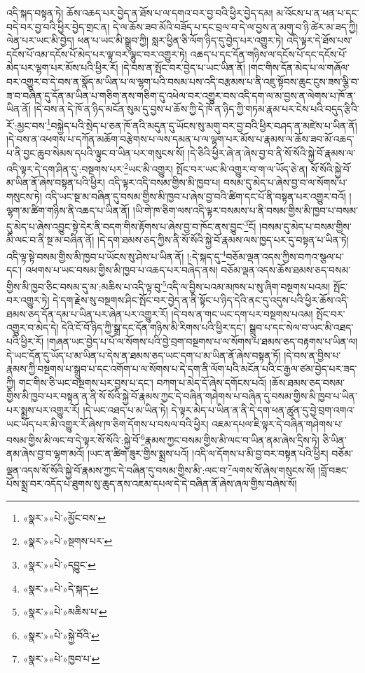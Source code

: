 འདི་སྐད་བསྟན་ཏེ། ཆོས་འཆད་པར་བྱེད་ན་ཐོས་པ་ལ་དགའ་བར་བྱ་བའི་ཕྱིར་བྱེད་དམ། མ་འོངས་པ་ན་ཕན་པ་དང་བདེ་བར་བྱ་བའི་ཕྱིར་བྱེད་གྲང་ན། དེ་ལ་ཆོས་ཟབ་མོའི་བཟོད་པ་དང་བྲལ་བ་དེ་ལ་བྱས་ན་མགུ་བ་ཉི་ཚེར་མ་ཟད་ཀྱི། ལེན་པར་ཡང་མི་བྱེད། ཕན་པ་ཡང་མི་སྒྲུབ་ཀྱི། སླར་ཕྱིན་ཅི་ལོག་ཉིད་དུ་བྱེད་པར་འགྱུར་ཏེ། འདི་ལྟར་དེ་ཐོས་པས་དངོས་པོ་འམ་དངོས་པོ་མེད་པར་ལྟ་བར་ལྷུང་བར་འགྱུར་ཏེ། འཆད་པ་དང་དོན་གཉིས་ལ་དངོས་པོ་དང་དངོས་པོ་མེད་པར་ལྷག་པར་མོས་པའི་ཕྱིར་རོ། །དེ་བས་ན་སྤོང་བར་བྱེད་པ་ཡང་ཡིན་ནོ། །གང་གིས་དོན་མེད་པ་ལ་གཞོལ་བར་འགྱུར་བ་དེ་བས་ན་སྣོད་མ་ཡིན་པ་ལ་ལྷག་པའི་བསམ་པས་འདི་བརྩམས་པ་ནི་འཇུ་སྟོབས་ཆུང་ངུས་ཟས་ལྕི་བ་ཟ་བ་བཞིན་དུ་དོན་མ་ཡིན་པ་གཅིག་ནས་གཅིག་དུ་འཕེལ་བར་འགྱུར་བས་འདི་དག་ལ་མ་བྱས་ན་ལེགས་པ་ཁོ་ན་ཡིན་ནོ། །དེ་བས་ན་དེ་ཁོ་ན་ཉིད་མངོན་སུམ་དུ་བྱས་པ་ཆོས་ཀྱི་དེ་ཁོ་ན་ཉིད་ཀྱི་གཏམ་རྣམ་པར་ངེས་པའི་བདུད་རྩིའི་རོ་:མྱང་བས་\footnote{«སྣར་»«པེ་»མྱོང་བས་}བསྐྱེད་པའི་སྲེད་པ་ཅན་ཁོ་ནའི་མདུན་དུ་ཡོངས་སུ་མགུ་བར་བྱ་བའི་ཕྱིར་བཤད་ན་མཛེས་པ་ཡིན་ནོ། །དེ་བས་ན་འཕགས་པ་དཀོན་མཆོག་བརྩེགས་པ་ལས་དམན་པ་ལ་ལྷག་པར་མོས་པ་རྣམས་ལ་ཆོས་ཟབ་མོ་འཆད་པ་ནི་བྱང་ཆུབ་སེམས་དཔའི་ལྟུང་བ་ཡིན་པར་གསུངས་སོ། །དེ་ཅིའི་ཕྱིར་ཞེ་ན་ཞེས་བྱ་བ་ནི་སོ་སོའི་སྐྱེ་བོ་རྣམས་ལ་འདི་ལྟར་དེ་དག་ཤིན་དུ་:བསྔགས་པར་\footnote{«སྣར་»«པེ་»སྔགས་པར་}ཡང་མི་འགྱུར། སྤོང་བར་ཡང་མི་འགྱུར་བ་ག་ལ་ཡོད་ཅེ་ན། སོ་སོའི་སྐྱེ་བོ་མ་ཡིན་ནོ་ཞེས་བསྟན་པའི་ཕྱིར། འདི་ལྟར་འདི་བསམ་གྱིས་མི་ཁྱབ་པ། བསམ་དུ་མེད་པ་ཞེས་བྱ་བ་ལ་སོགས་པ་གསུངས་ཏེ། འདི་ཡང་སྔ་མ་བཞིན་དུ་བསམ་གྱིས་མི་ཁྱབ་པ་ཞེས་བྱ་བའི་ཚིག་དང་པོ་ནི་བསྟན་པར་འགྱུར་བའོ། །ལྷག་མ་ཚིག་གཉིས་ནི་འཆད་པ་ཡིན་ནོ། །ཡི་གེ་ཁ་ཅིག་ལས་འདི་ལྟར་བསམས་པ་ནི་བསམ་གྱིས་མི་ཁྱབ་པ་བསམ་དུ་མེད་པ་ཞེས་འབྱུང་སྟེ་དེར་ནི་བདག་གིས་རྟོགས་པ་ཞེས་བྱ་བ་ཁོང་ནས་བྱུང་\footnote{«སྣར་»«པེ་»དབྱུང་}ངོ། །བསམ་དུ་མེད་པ་བསམ་གྱིས་མི་ལང་བ་ནི་སྔ་མ་བཞིན་ནོ། །དེ་དག་ཐམས་ཅད་ཀྱིས་ནི་སོ་སོའི་སྐྱེ་བོ་རྣམས་ལས་ཁྱད་པར་དུ་བསྟན་པ་ཡིན་ཏེ། འདི་ལྟ་སྟེ་བསམ་གྱིས་མི་ཁྱབ་པ་ཡོངས་སུ་ཤེས་པ་ཡིན་ནོ། །:དེ་སྐད་དུ་\footnote{«སྣར་»«པེ་»དེ་སྐད་}བཅོམ་ལྡན་འདས་ཀྱིས་བཀའ་སྩལ་པ་དང་། འཕགས་པ་ཡང་བསམ་གྱིས་མི་ཁྱབ་པ་འཆད་པར་བཞེད་ནས། བཅོམ་ལྡན་འདས་ཆོས་ཐམས་ཅད་བསམ་གྱིས་མི་ཁྱབ་ཅིང་བསམ་དུ་མ་:མཆིས་པ་འདི་ལྟ་བུ་\footnote{«སྣར་»«པེ་»མཆིས་པ་}འདི་ལ་བྱིས་པའམ་མཁས་པ་སུ་ཞིག་བསྔགས་པའམ། སྤོང་བར་འགྱུར་ཏེ། དེ་དག་རྗེས་སུ་བསྔགས་ཤིང་སྤོང་བར་བྱེད་ན་ནི་སྟོང་པ་ཉིད་དེའི་ནང་དུ་འདུས་པའི་ཕྱིར་ཆོས་འདི་ཐམས་ཅད་དོན་དམ་པ་ཡིན་པར་ཞེན་པར་འགྱུར་རོ། །དེ་བས་ན་གང་ཡང་དག་པར་བསྔགས་པའམ། སྤོང་བར་འགྱུར་བ་མེད་དེ། དེའི་ངོ་བོ་ཉིད་ཀྱི་སྒྲ་དང་དོན་གཉིས་མི་རིགས་པའི་ཕྱིར་དང་། སྒྲུབ་པ་དང་སེལ་བ་ཡང་མི་འཐད་པའི་ཕྱིར་རོ། །གཞན་ཡང་བྱེད་པ་པོ་ལ་སོགས་པའི་བྱེ་བྲག་བསྔགས་པ་ལ་སོགས་པ་ཐམས་ཅད་བརྟགས་པ་ཡིན་ལ། དེ་ཡང་དོན་དུ་ཡོད་པ་མ་ཡིན་པ་དེས་ན་ཐམས་ཅད་ཡང་དག་པ་མ་ཡིན་ནོ་ཞེས་བསྟན་ཏོ། །དེ་བས་ན་བྱིས་པ་རྣམས་ཀྱི་བསྔགས་པ་སྒྲུབ་པ་དང་འགོག་པ་ལ་སོགས་པ་དེ་དག་ནི་ལོག་པའི་མངོན་པའི་ང་རྒྱལ་ཙམ་བྱེད་པར་ཟད་ཀྱི། གང་གིས་ཅི་ཡང་བསྔགས་པར་བྱས་པ་དང་། བཀག་པ་མེད་དོ་ཞེས་དགོངས་པའོ། །ཆོས་ཐམས་ཅད་བསམ་གྱིས་མི་ཁྱབ་པར་བསྟན་ན་ནི་སོ་སོའི་སྐྱེ་བོ་རྣམས་ཀྱང་དེ་བཞིན་གཤེགས་པ་བཞིན་དུ་བསམ་གྱིས་མི་ཁྱབ་པ་ཡིན་པར་སྨྲས་པར་འགྱུར་རོ། །དེ་ཡང་འཐད་པ་མ་ཡིན་ཏེ། དེ་ལྟར་མེད་པ་ཡིན་ན་ནི་དེ་དག་ཕན་ཚུན་དུ་བྱེ་བྲག་འགའ་ཡང་ཡོད་པར་མི་འགྱུར་རོ་ཞེས་ཁ་ཅིག་དོགས་པ་བསལ་བའི་ཕྱིར། འཇམ་དཔལ་ཇི་ལྟར་དེ་བཞིན་གཤེགས་པ་བསམ་གྱིས་མི་ལང་བ་དེ་ལྟར་སོ་སོའི་:སྐྱེ་བོ་\footnote{«སྣར་»«པེ་»སྐྱེ་བོའི་}རྣམས་ཀྱང་བསམ་གྱིས་མི་ལང་བ་ཡིན་ནམ་ཞེས་དྲིས་ཏེ། ཅི་ཡིན་ནམ་ཞེས་བྱ་བ་ལྷག་མའོ། །ཡང་ན་ཚིག་ཟུར་གྱིས་སྨྲས་པའོ། །འདི་ལ་དོགས་པ་མི་བྱ་བར་བསྟན་པའི་ཕྱིར། བཅོམ་ལྡན་འདས་སོ་སོའི་སྐྱེ་བོ་རྣམས་ཀྱང་དེ་བཞིན་དུ་བསམ་གྱིས་མི་:ལང་བ་\footnote{«སྣར་»«པེ་»ཁྱབ་པ་}ལགས་སོ་ཞེས་གསུངས་སོ། །བློ་བཟང་པོས་སྨྲ་བར་འདོད་པ་ཐུགས་སུ་ཆུད་ནས་འཇམ་དཔལ་དེ་དེ་བཞིན་ནོ་ཞེས་ཞལ་གྱིས་བཞེས་སོ། 